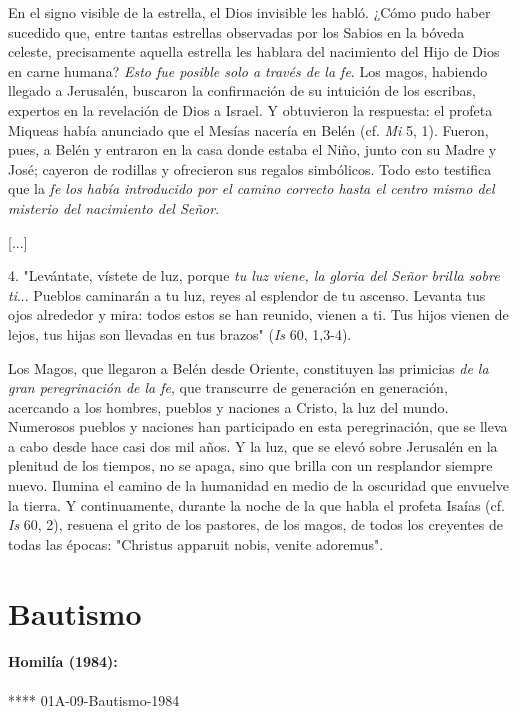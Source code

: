 En el signo visible de la estrella, el Dios invisible les habló. ¿Cómo
pudo haber sucedido que, entre tantas estrellas observadas por los
Sabios en la bóveda celeste, precisamente aquella estrella les hablara
del nacimiento del Hijo de Dios en carne humana? \emph{Esto fue posible
	solo a través de la fe}. Los magos, habiendo llegado a Jerusalén,
buscaron la confirmación de su intuición de los escribas, expertos en la
revelación de Dios a Israel. Y obtuvieron la respuesta: el profeta
Miqueas había anunciado que el Mesías nacería en Belén (cf. \emph{Mi} 5,
1). Fueron, pues, a Belén y entraron en la casa donde estaba el Niño,
junto con su Madre y José; cayeron de rodillas y ofrecieron sus regalos
simbólicos. Todo esto testifica que la \emph{fe los había introducido
	por el camino correcto hasta el centro mismo del misterio del nacimiento
	del Señor}.

{[}...{]}

4. "Levántate, vístete de luz, porque \emph{tu luz viene, la gloria del
	Señor brilla sobre ti}... Pueblos caminarán a tu luz, reyes al esplendor
de tu ascenso. Levanta tus ojos alrededor y mira: todos estos se han
reunido, vienen a ti. Tus hijos vienen de lejos, tus hijas son llevadas
en tus brazos" (\emph{Is} 60, 1,3-4).

Los Magos, que llegaron a Belén desde Oriente, constituyen las primicias
\emph{de la gran peregrinación de la fe}, que transcurre de generación
en generación, acercando a los hombres, pueblos y naciones a Cristo, la
luz del mundo. Numerosos pueblos y naciones han participado en esta
peregrinación, que se lleva a cabo desde hace casi dos mil años. Y la
luz, que se elevó sobre Jerusalén en la plenitud de los tiempos, no se
apaga, sino que brilla con un resplandor siempre nuevo. Ilumina el
camino de la humanidad en medio de la oscuridad que envuelve la tierra.
Y continuamente, durante la noche de la que habla el profeta Isaías (cf.
\emph{Is} 60, 2), resuena el grito de los pastores, de los magos, de
todos los creyentes de todas las épocas: "Christus apparuit nobis,
venite adoremus".

\chapter{Bautismo}

\subsubsection{Homilía (1984): }
****
01A-09-Bautismo-1984

